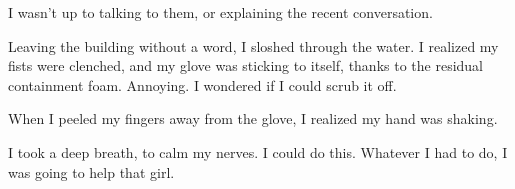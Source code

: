I wasn't up to talking to them, or explaining the recent conversation.



Leaving the building without a word, I sloshed through the water.  I realized my fists were clenched, and my glove was sticking to itself, thanks to the residual containment foam.  Annoying.  I wondered if I could scrub it off.



When I peeled my fingers away from the glove, I realized my hand was shaking.



I took a deep breath, to calm my nerves.  I could do this.  Whatever I had to do, I was going to help that girl.





